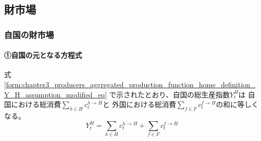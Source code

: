 
\subsection{財市場}
\label{sec:chapter3_representative_household_goods_market}

\subsubsection{自国の財市場}
\label{sec:chapter3_representative_household_goods_market_home}

\paragraph{①自国の元となる方程式}
\label{sec:chapter3_representative_household_goods_market_home_original}
式\eqref{form:chapter3_producers_aggregated_production_function_home_definition_Y_H_assumption_modified_eq}
で示されたとおり、自国の総生産指数\(Y_t^H\)は
自国における総消費\(\sum_{h\in H}c_t^{h\to H}\)と
外国における総消費\(\sum_{f\in F}c_t^{f\to H}\)の和に等しくなる。
\begin{equation}
\label{form:chapter3_representative_household_goods_market_home_original_Y_H_eq}
    Y_t^H=\sum_{h\in H}c_t^{h\to H}+\sum_{f\in F}c_t^{f\to H}
\end{equation}

